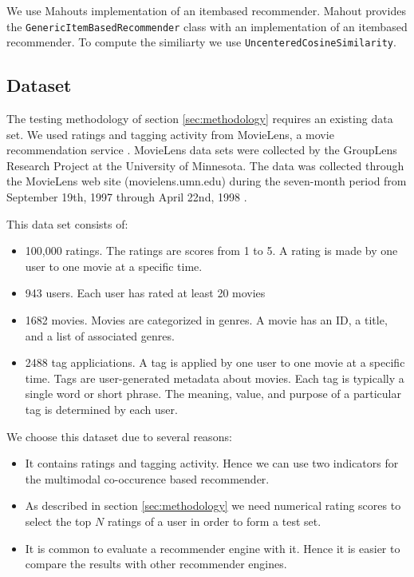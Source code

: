 We use Mahouts implementation of an \gls{itembased} recommender. Mahout provides the \verb|GenericItemBasedRecommender| class with an implementation of an \gls{itembased} recommender. To compute the similiarty we use \verb|UncenteredCosineSimilarity|.

\subsection{Dataset}
\label{sec:dataset}

The testing methodology of section \ref{sec:methodology} requires an existing data set. We used ratings and tagging activity from MovieLens, a movie recommendation service \cite{movielensdata}.
MovieLens data sets were collected by the GroupLens Research Project at the University of Minnesota. The data was collected through the MovieLens web site (movielens.umn.edu) during the seven-month period from September 19th, 1997 through April 22nd, 1998 \cite{movielensdata}.

This data set consists of:
\begin{itemize}
\item 100,000 ratings. The ratings are scores from 1 to 5. A rating is made by one user to one movie at a specific time. 

\item 943 users. Each user has rated at least 20 movies
\item 1682 movies. Movies are categorized in genres. A movie has an ID, a title, and a list of associated genres. 
\item 2488 \gls{tag} appliciations. A \gls{tag} is applied by one user to one movie at a specific time. Tags are user-generated metadata about movies. Each tag is typically a single word or short phrase. The meaning, value, and purpose of a particular tag is determined by each user.
\end{itemize}
 
We choose this dataset due to several reasons:
\begin{itemize}
\item It contains ratings and tagging activity. Hence we can use two indicators for the multimodal co-occurence based recommender.
\item As described in section \ref{sec:methodology} we need numerical rating scores to select the top $N$ ratings of a user in order to form a test set. 
\item  It is common to evaluate a recommender engine with it. Hence it is easier to compare the results with other recommender engines. 
\end{itemize}


